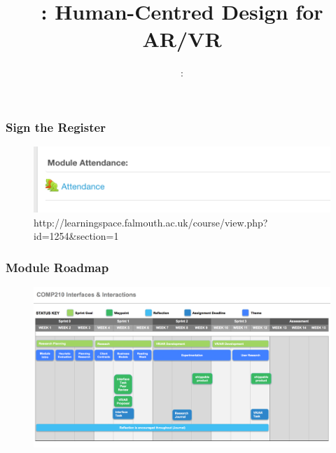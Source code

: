 \usepackage{../../beamerthemeFalmouthGamesAcademy}
\usepackage{multimedia}
\usepackage{soul}
\usepackage{tikz}
\usepackage{verbatim}
\graphicspath{ {../../} }


\usepackage[normalem]{ulem}
\usepackage{wasysym}

\usepackage{pdfpages}

\usetikzlibrary{arrows,automata}




\title{\sessionnumber: \normalsize{Human-Centred Design for AR/VR}}
\subtitle{\modulecode: \moduletitle}

\frame{\titlepage} 

\begin{frame}
	\frametitle{Sign the Register}
	\begin{figure}
		\includegraphics[scale=.5]{assets/attendance}
		\caption{\tiny{http://learningspace.falmouth.ac.uk/course/view.php?id=1254\&section=1 }}
	\end{figure}
\end{frame}



\begin{frame}
	\frametitle{Module Roadmap}
	\begin{figure}
		\includegraphics[scale=.14]{assets/roadmap}
	\end{figure}
\end{frame}


